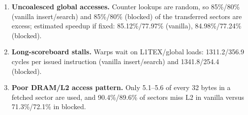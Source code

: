 \begin{enumerate}
\item \textbf{Uncoalesced global accesses.} Counter lookups are random, so 85\%/80\% (vanilla insert/search) and 85\%/80\% (blocked) of the transferred sectors are excess; estimated speedup if fixed: 85.12\%/77.97\% (vanilla), 84.98\%/77.24\% (blocked).
\item \textbf{Long-scoreboard stalls.} Warps wait on L1TEX/global loads: 1311.2/356.9 cycles per issued instruction (vanilla insert/search) and 1341.8/254.4 (blocked).
\item \textbf{Poor DRAM/L2 access pattern.} Only 5.1--5.6 of every 32 bytes in a fetched sector are used, and 90.4\%/89.6\% of sectors miss L2 in vanilla versus 71.3\%/72.1\% in blocked.
\end{enumerate}